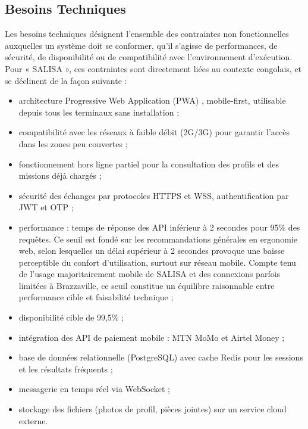 \subsection{Besoins Techniques}

Les besoins techniques désignent l'ensemble des contraintes non fonctionnelles auxquelles un système doit se conformer, qu'il s'agisse de performances, de sécurité, de disponibilité ou de compatibilité avec l'environnement d'exécution. Pour « SALISA », ces contraintes sont directement liées au contexte congolais, et se déclinent de la façon suivante :

\begin{itemize}[label=\textbf{-}]
	\item architecture Progressive Web Application (PWA) \cite{next_js}, mobile-first, utilisable depuis tous les terminaux sans installation ;
	\item compatibilité avec les réseaux à faible débit (2G/3G) pour garantir l'accès dans les zones peu couvertes ;
	\item fonctionnement hors ligne partiel pour la consultation des profils et des missions déjà chargés ;
	\item sécurité des échanges par protocoles HTTPS et WSS, authentification par JWT et OTP ;
	
	\item performance : temps de réponse des API inférieur à 2 secondes pour 95\% des requêtes. Ce seuil est fondé sur les recommandations générales en ergonomie web, selon lesquelles un délai supérieur à 2 secondes provoque une baisse perceptible du confort d'utilisation, surtout sur réseau mobile. Compte tenu de l'usage majoritairement mobile de SALISA et des connexions parfois limitées à Brazzaville, ce seuil constitue un équilibre raisonnable entre performance cible et faisabilité technique ;
	
	\item disponibilité cible de 99,5\% ;
	\item intégration des API de paiement mobile : MTN MoMo et Airtel Money \cite{mtn_momo} ;
	\item base de données relationnelle (PostgreSQL) \cite{postgresql} avec cache Redis pour les sessions et les résultats fréquents ;
	\item messagerie en temps réel via WebSocket ;
	\item stockage des fichiers (photos de profil, pièces jointes) sur un service cloud externe.
\end{itemize}

